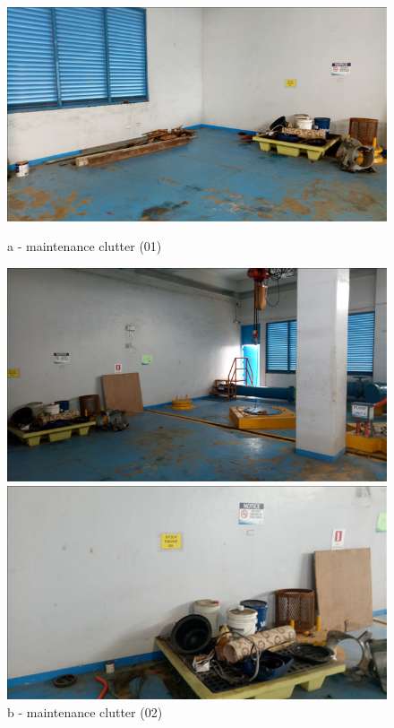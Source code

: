 \begin{figure}
	\begin{minipage}[b]{0.3\linewidth}
		\centering
		\includegraphics[width=\textwidth]{figures/fig_ch047_wem_housekeeping6}
		\caption*{a - maintenance clutter (01)}
		\label{ch047_wem_housekeeping6}
	\end{minipage}
	\hspace{0.05cm}
	\begin{minipage}[b]{0.3\linewidth}
		\centering
		\includegraphics[width=\textwidth]{figures/fig_ch047_wem_housekeeping4}
		\caption*{b - maintenance clutter (02)}
		\label{ch047_wem_housekeeping4}
	\end{minipage}
	\hspace{0.05cm}
	\begin{minipage}[b]{0.3\linewidth}
		\centering
		\includegraphics[width=\textwidth]{figures/fig_ch047_wem_housekeeping1}

\end{minipage}
\end{figure}
